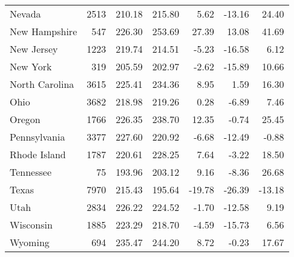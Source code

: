 \begin{table}[ht]
\begin{center}
\begin{tabular}{lrrrrrr}
  Nevada & 2513 & 210.18 & 215.80 & 5.62 & -13.16 & 24.40 \\ 
  New Hampshire & 547 & 226.30 & 253.69 & 27.39 & 13.08 & 41.69 \\ 
  New Jersey & 1223 & 219.74 & 214.51 & -5.23 & -16.58 & 6.12 \\ 
  New York & 319 & 205.59 & 202.97 & -2.62 & -15.89 & 10.66 \\ 
  North Carolina & 3615 & 225.41 & 234.36 & 8.95 & 1.59 & 16.30 \\ 
  Ohio & 3682 & 218.98 & 219.26 & 0.28 & -6.89 & 7.46 \\ 
  Oregon & 1766 & 226.35 & 238.70 & 12.35 & -0.74 & 25.45 \\ 
  Pennsylvania & 3377 & 227.60 & 220.92 & -6.68 & -12.49 & -0.88 \\ 
  Rhode Island & 1787 & 220.61 & 228.25 & 7.64 & -3.22 & 18.50 \\ 
  Tennessee &  75 & 193.96 & 203.12 & 9.16 & -8.36 & 26.68 \\ 
  Texas & 7970 & 215.43 & 195.64 & -19.78 & -26.39 & -13.18 \\ 
  Utah & 2834 & 226.22 & 224.52 & -1.70 & -12.58 & 9.19 \\ 
  Wisconsin & 1885 & 223.29 & 218.70 & -4.59 & -15.73 & 6.56 \\ 
  Wyoming & 694 & 235.47 & 244.20 & 8.72 & -0.23 & 17.67 \\ 
   \hline
\end{tabular}
\end{center}
\end{table}
